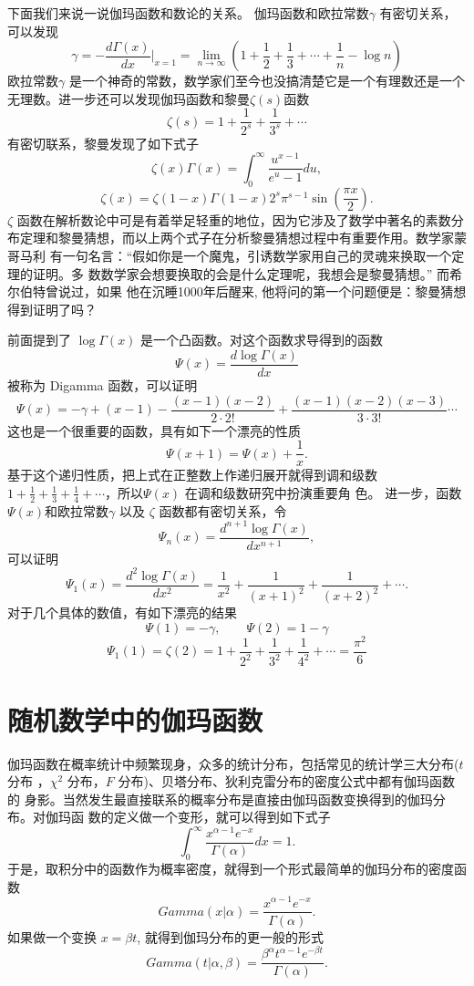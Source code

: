 下面我们来说一说伽玛函数和数论的关系。 伽玛函数和欧拉常数$\gamma$ 有密切关系，
可以发现
$$ \gamma = -\frac{d\Gamma(x)}{dx}|_{x=1} =
\lim_{n\rightarrow \infty}(1+\frac{1}{2} + \frac{1}{3}+\cdots+\frac{1}{n} - \log n) $$
欧拉常数$\gamma$ 是一个神奇的常数，数学家们至今也没搞清楚它是一个有理数还是一个
无理数。进一步还可以发现伽玛函数和黎曼$\zeta(s)$函数
$$ \zeta(s) = 1+\frac{1}{2^s} + \frac{1}{3^s} + \cdots $$
有密切联系，黎曼发现了如下式子
$$ \zeta(x) \Gamma(x) = \int_0^\infty \frac{u^{x-1}}{e^u - 1} du ,$$
$$ \zeta(x) = \zeta(1-x) \Gamma(1-x) 2^s \pi^{s-1} \sin\left(\frac{\pi x}{2}\right)  .$$
$\zeta$ 函数在解析数论中可是有着举足轻重的地位，因为它涉及了数学中著名的素数分
布定理和黎曼猜想，而以上两个式子在分析黎曼猜想过程中有重要作用。数学家蒙哥马利
有一句名言：“假如你是一个魔鬼，引诱数学家用自己的灵魂来换取一个定理的证明。多
数数学家会想要换取的会是什么定理呢，我想会是黎曼猜想。” 而希尔伯特曾说过，如果
他在沉睡1000年后醒来, 他将问的第一个问题便是：黎曼猜想得到证明了吗？

前面提到了 $\log\Gamma(x)$ 是一个凸函数。对这个函数求导得到的函数
$$ \Psi(x) = \frac{d\log\Gamma(x)}{dx}  $$
被称为 Digamma 函数，可以证明
$$\Psi(x) = -\gamma + (x-1) - \frac{(x-1)(x-2)}{2\cdot 2!} 
+ \frac{(x-1)(x-2)(x-3)}{3\cdot 3!} \cdots $$
这也是一个很重要的函数，具有如下一个漂亮的性质
$$ \Psi(x+1) = \Psi(x) + \frac{1}{x} .$$
基于这个递归性质，把上式在正整数上作递归展开就得到调和级数 $1+\frac{1}{2} +
\frac{1}{3} + \frac{1}{4} + \cdots $，所以$\Psi(x)$ 在调和级数研究中扮演重要角
色。 进一步，函数$\Psi(x)$和欧拉常数$\gamma$ 以及 $\zeta$ 函数都有密切关系，令
$$ \Psi_n(x) = \frac{d^{n+1}\log\Gamma(x)}{dx^{n+1}} ,$$
可以证明
$$\Psi_1(x) = \frac{d^{2}\log\Gamma(x)}{dx^{2}}
= \frac{1}{x^2} + \frac{1}{(x+1)^2} + \frac{1}{(x+2)^2} + \cdots .$$
对于几个具体的数值，有如下漂亮的结果
$$\Psi(1) = -\gamma, \quad \quad \Psi(2) = 1-\gamma $$
$$\Psi_1(1) = \zeta(2) = 1 + \frac{1}{2^2} + \frac{1}{3^2} + \frac{1}{4^2} +  \cdots 
= \frac{\pi^2}{6} $$


\section{随机数学中的伽玛函数}

伽玛函数在概率统计中频繁现身，众多的统计分布，包括常见的统计学三大分布($t$ 分布
，$\chi^2$ 分布，$F$ 分布)、贝塔分布、狄利克雷分布的密度公式中都有伽玛函数的
身影。当然发生最直接联系的概率分布是直接由伽玛函数变换得到的伽玛分布。对伽玛函
数的定义做一个变形，就可以得到如下式子
$$ \int_0^{\infty} \frac{x^{\alpha-1}e^{-x}}{\Gamma(\alpha)}dx = 1 .$$
于是，取积分中的函数作为概率密度，就得到一个形式最简单的伽玛分布的密度函数
$$Gamma(x|\alpha) = \frac{x^{\alpha-1}e^{-x}}{\Gamma(\alpha)} .$$
如果做一个变换 $x=\beta t$, 就得到伽玛分布的更一般的形式
$$Gamma(t|\alpha, \beta) = \frac{\beta^\alpha t^{\alpha-1}e^{-\beta t}}{\Gamma(\alpha)} .$$

